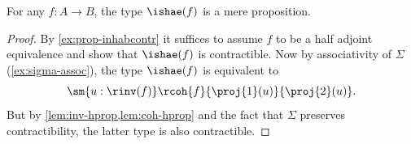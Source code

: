 %
\begin{thm}\label{thm:hae-hprop}
  For any $f : A \to B$, the type $\ishae(f)$ is a mere proposition.
\end{thm}

\begin{proof}
  By \cref{ex:prop-inhabcontr} it suffices to assume $f$ to be a half adjoint equivalence and show that $\ishae(f)$ is contractible.
  Now by associativity of $\Sigma$ (\cref{ex:sigma-assoc}), the type $\ishae(f)$ is equivalent to
  \[\sm{u : \rinv(f)} \rcoh{f}{\proj{1}(u)}{\proj{2}(u)}.\]
  But by \cref{lem:inv-hprop,lem:coh-hprop} and the fact that $\Sigma$ preserves contractibility, the latter type is also contractible.
\end{proof}

